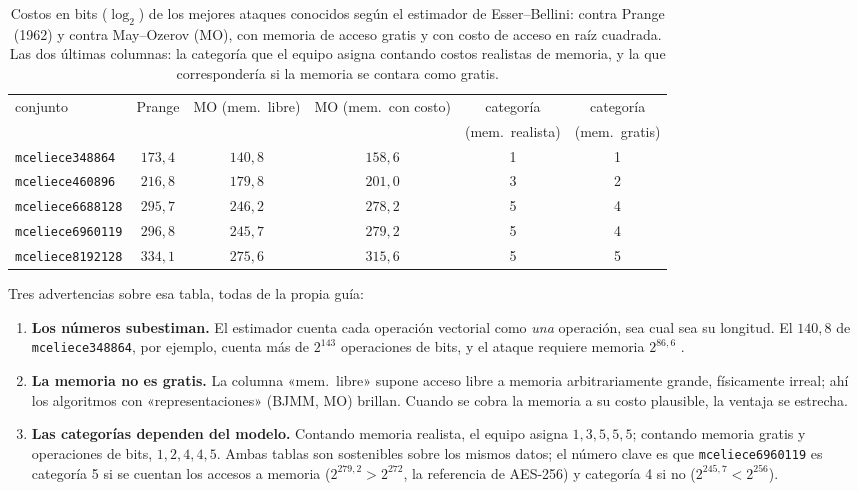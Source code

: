 \documentclass[11pt,a4paper,oneside]{report}
\begin{document}
\begin{table}[htbp]
\centering
\footnotesize
\setlength{\tabcolsep}{5pt}
\begin{tabular}{lccccc}
\toprule
conjunto & Prange & MO (mem.\ libre) & MO (mem.\ con costo) & categoría & categoría\\
 & & & & (mem.\ realista) & (mem.\ gratis)\\
\midrule
\texttt{mceliece348864} & $173{,}4$ & $140{,}8$ & $158{,}6$ & 1 & 1\\
\texttt{mceliece460896} & $216{,}8$ & $179{,}8$ & $201{,}0$ & 3 & 2\\
\texttt{mceliece6688128} & $295{,}7$ & $246{,}2$ & $278{,}2$ & 5 & 4\\
\texttt{mceliece6960119} & $296{,}8$ & $245{,}7$ & $279{,}2$ & 5 & 4\\
\texttt{mceliece8192128} & $334{,}1$ & $275{,}6$ & $315{,}6$ & 5 & 5\\
\bottomrule
\end{tabular}
\caption{Costos en bits ($\log_2$) de los mejores ataques conocidos
según el estimador de Esser--Bellini: contra Prange (1962) y contra
May--Ozerov (MO), con memoria de acceso gratis y con costo de acceso
en raíz cuadrada. Las dos últimas columnas: la categoría que el
equipo asigna contando costos realistas de memoria, y la que
correspondería si la memoria se contara como gratis.}
\label{tab:param-seguridad}
\end{table}

Tres advertencias sobre esa tabla, todas de la propia guía:

\begin{enumerate}[leftmargin=1.6em,itemsep=3pt]
  \item \textbf{Los números subestiman.} El estimador cuenta cada
        operación vectorial como \emph{una} operación, sea cual sea su
        longitud. El $140{,}8$ de \texttt{mceliece348864}, por ejemplo,
        cuenta más de $2^{143}$ operaciones de bits, y el ataque
        requiere memoria $2^{86{,}6}$ \cite{cmsecurity}.
  \item \textbf{La memoria no es gratis.} La columna «mem.\ libre»
        supone acceso libre a memoria arbitrariamente grande,
        físicamente irreal; ahí los algoritmos con
        «representaciones» (BJMM, MO) brillan. Cuando se cobra la
        memoria a su costo plausible, la ventaja se estrecha.
  \item \textbf{Las categorías dependen del modelo.} Contando
        memoria realista, el equipo asigna $1,3,5,5,5$; contando
        memoria gratis y operaciones de bits, $1,2,4,4,5$. Ambas
        tablas son sostenibles sobre los mismos datos; el número clave
        es que \texttt{mceliece6960119} es categoría 5 si se cuentan
        los accesos a memoria ($2^{279{,}2}>2^{272}$, la referencia de
        AES-256) y categoría 4 si no ($2^{245{,}7}<2^{256}$).
\end{enumerate}
\end{document}
